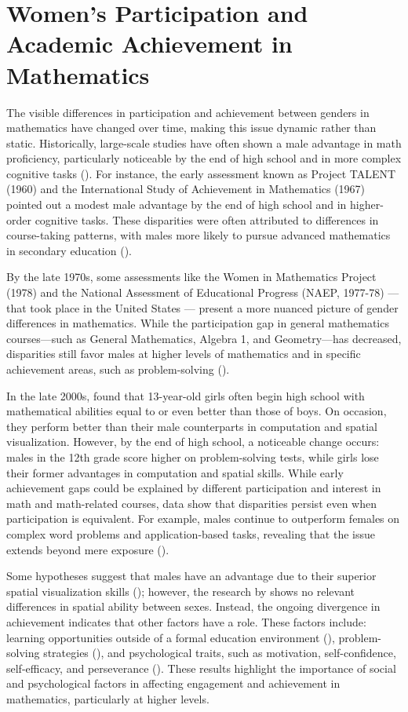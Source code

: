\section{Women's Participation and Academic Achievement in Mathematics}
The visible differences in participation and achievement between genders in mathematics have changed over time, making this issue dynamic rather than static.
Historically, large-scale studies have often shown a male advantage in math proficiency, particularly noticeable by the end of high school and in more complex cognitive tasks (\cite{LiuWilson2009}). For instance, the early assessment known as Project TALENT (1960) and the International Study of Achievement in Mathematics (1967) pointed out a modest male advantage by the end of high school and in higher-order cognitive tasks. These disparities were often attributed to differences in course-taking patterns, with males more likely to pursue advanced mathematics in secondary education (\cite{Armstrong}).

By the late 1970s, some assessments like the Women in Mathematics Project (1978) and the National Assessment of Educational Progress (NAEP, 1977-78) — that took place in the United States — present a more nuanced picture of gender differences in mathematics. While the participation gap in general mathematics courses—such as General Mathematics, Algebra 1, and Geometry—has decreased, disparities still favor males at higher levels of mathematics and in specific achievement areas, such as problem-solving (\cite{Armstrong}).

In the late 2000s, \textcite{Zel} found that 13-year-old girls often begin high school with mathematical abilities equal to or even better than those of boys. On occasion, they perform better than their male counterparts in computation and spatial visualization. However, by the end of high school, a noticeable change occurs: males in the 12th grade score higher on problem-solving tests, while girls lose their former advantages in computation and spatial skills. While early achievement gaps could be explained by different participation and interest in math and math-related courses, data show that disparities persist even when participation is equivalent. For example, males continue to outperform females on complex word problems and application-based tasks, revealing that the issue extends beyond mere exposure (\cite{Zel}).

Some hypotheses suggest that males have an advantage due to their superior spatial visualization skills (\cite{RamirezUcles2020}); however, the research by \textcite{FennemaTartre1985} shows no relevant differences in spatial ability between sexes. Instead, the ongoing divergence in achievement indicates that other factors have a role. These factors include: learning opportunities outside of a formal education environment (\cite{Boeren2011}), problem-solving strategies (\cite{RamirezUcles2020}), and psychological traits, such as motivation, self-confidence, self-efficacy, and perseverance (\cite{Rodriguez2020}). These results highlight the importance of social and psychological factors in affecting engagement and achievement in mathematics, particularly at higher levels.

